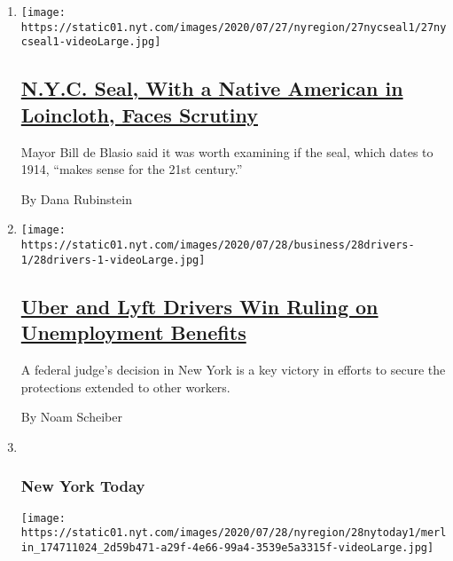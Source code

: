\begin{enumerate}
\def\labelenumi{\arabic{enumi}.}
\item
  \texttt{[image: https://static01.nyt.com/images/2020/07/27/nyregion/27nycseal1/27nycseal1-videoLarge.jpg]}

  \hypertarget{nyc-seal-with-a-native-american-in-loincloth-faces-scrutiny}{%
  \subsection{\texorpdfstring{\href{/2020/07/27/nyregion/seal-nyc-native-american.html}{N.Y.C.
  Seal, With a Native American in Loincloth, Faces
  Scrutiny}}{N.Y.C. Seal, With a Native American in Loincloth, Faces Scrutiny}}\label{nyc-seal-with-a-native-american-in-loincloth-faces-scrutiny}}

  Mayor Bill de Blasio said it was worth examining if the seal, which
  dates to 1914, ``makes sense for the 21st century.''

  By Dana Rubinstein
\item
  \texttt{[image: https://static01.nyt.com/images/2020/07/28/business/28drivers-1/28drivers-1-videoLarge.jpg]}

  \hypertarget{uber-and-lyft-drivers-win-ruling-on-unemployment-benefits}{%
  \subsection{\texorpdfstring{\href{/2020/07/28/business/economy/lyft-uber-drivers-unemployment.html}{Uber
  and Lyft Drivers Win Ruling on Unemployment
  Benefits}}{Uber and Lyft Drivers Win Ruling on Unemployment Benefits}}\label{uber-and-lyft-drivers-win-ruling-on-unemployment-benefits}}

  A federal judge's decision in New York is a key victory in efforts to
  secure the protections extended to other workers.

  By Noam Scheiber
\item ~
  \hypertarget{new-york-today}{%
  \subsubsection{New York Today}\label{new-york-today}}

  \texttt{[image: https://static01.nyt.com/images/2020/07/28/nyregion/28nytoday1/merlin\_174711024\_2d59b471-a29f-4e66-99a4-3539e5a3315f-videoLarge.jpg]}

  \hypertarget{black-lives-matter-art-outside-trump-tower-is-being-vandalized}{%
}
\end{enumerate}
